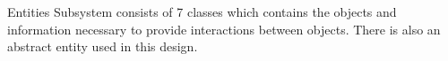 \documentclass[12pt]{article} %
\begin{document}
Entities Subsystem consists of 7 classes which contains the objects and information necessary to provide interactions between objects.  There is also an abstract entity used in this design.







\pagebreak
\begin{thebibliography}{99} %

 
\end{thebibliography}

\end{document}
